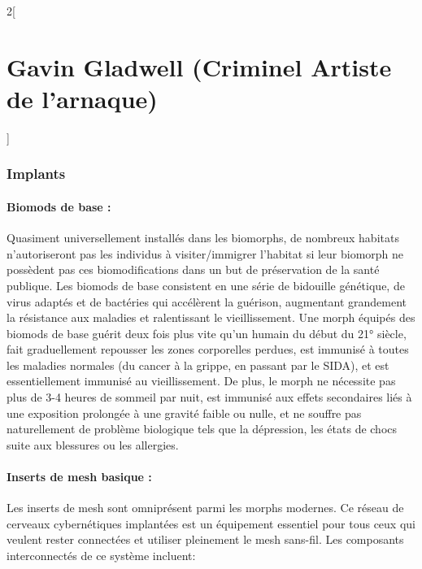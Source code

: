 \documentclass[a4paper,9pt]{article}
\begin{document}
\begin{multicols}{2}[\section*{Gavin Gladwell (Criminel Artiste de l'arnaque)}]
\subsubsection*{Implants}

\paragraph{Biomods de base :} 
Quasiment universellement  installés dans les biomorphs, de nombreux habitats
n'autoriseront pas les individus à visiter/immigrer l'habitat si leur biomorph
ne possèdent pas ces biomodifications dans un but de préservation de la santé
publique. Les biomods de base consistent en une série de bidouille génétique,
de virus adaptés et de bactéries qui accélèrent la guérison, augmentant
grandement la résistance aux maladies et ralentissant le vieillissement. Une
morph équipés des biomods de base guérit deux fois plus vite qu'un humain du
début du 21° siècle, fait graduellement repousser les zones corporelles
perdues, est immunisé à toutes les maladies normales (du cancer à la grippe, en
passant par le SIDA), et est essentiellement immunisé au vieillissement. De
plus, le morph ne nécessite pas plus de 3-4 heures de sommeil par nuit, est
immunisé aux effets secondaires liés à une exposition prolongée à une gravité
faible ou nulle, et ne souffre pas naturellement de problème biologique tels
que la dépression, les états de chocs suite aux blessures ou les allergies.

\paragraph{Inserts de mesh basique :} 
Les inserts de mesh sont omniprésent parmi les morphs modernes. Ce réseau de
cerveaux cybernétiques implantées est un équipement essentiel pour tous ceux
qui veulent rester connectées et utiliser pleinement le mesh sans-fil. Les
composants interconnectés de ce système incluent: 


\end{multicols}
\end{document}
